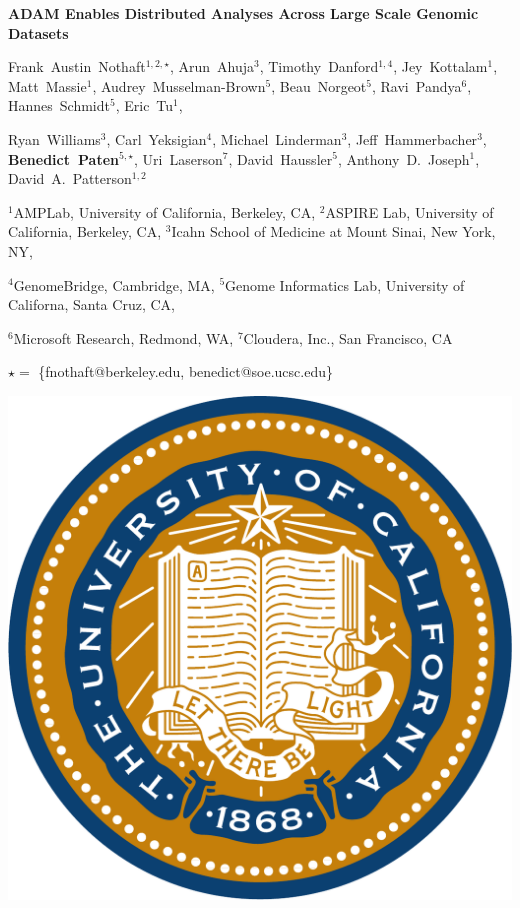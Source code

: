 \documentclass[11pt]{a0poster}
\date{}
\begin{document}
\begin{minipage}{0.887\linewidth}
\vspace{75pt}
\hspace{92pt}
\color{Blue}
{\fontsize{2.5cm}{1em} \textbf{ADAM Enables Distributed Analyses Across Large Scale Genomic Datasets}}

\hspace{92pt}
\fontsize{1cm}{1em}
Frank~Austin~Nothaft$^{1,2,\star}$, Arun~Ahuja$^3$, Timothy~Danford$^{1,4}$,
Jey~Kottalam$^1$, Matt~Massie$^1$, Audrey~Musselman-Brown$^5$, Beau~Norgeot$^5$,
Ravi~Pandya$^6$, Hannes~Schmidt$^5$, Eric~Tu$^1$,

\hspace{100pt} Ryan~Williams$^3$,
Carl~Yeksigian$^4$, Michael~Linderman$^3$, Jeff~Hammerbacher$^3$,
\textbf{Benedict~Paten}$^{5,\star}$, Uri~Laserson$^7$, David~Haussler$^5$,
Anthony~D.~Joseph$^1$, David~A.~Patterson$^{1,2}$

\hspace{100pt}
$^1$AMPLab, University of California, Berkeley, CA,
$^2$ASPIRE Lab, University of California, Berkeley, CA,
$^3$Icahn School of Medicine at Mount Sinai, New York, NY,

\hspace{100pt}
$^4$GenomeBridge, Cambridge, MA,
$^5$Genome Informatics Lab, University of Californa, Santa Cruz, CA,

\hspace{100pt}
$^6$Microsoft Research, Redmond, WA,
$^7$Cloudera, Inc., San Francisco, CA

\hspace{100pt}
\fontsize{1cm}{1em}
$\star =$ \{fnothaft@berkeley.edu, benedict@soe.ucsc.edu\}
\vspace{75pt}
\end{minipage}
\begin{minipage}{0.113\linewidth}
\includegraphics[scale=0.6]{ucseal_540_139.pdf}
\end{minipage}
\end{document}
